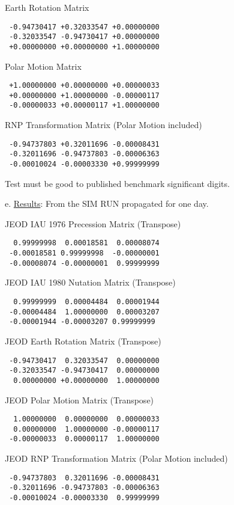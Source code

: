 Earth Rotation Matrix
\begin{verbatim}
 -0.94730417 +0.32033547 +0.00000000
 -0.32033547 -0.94730417 +0.00000000
 +0.00000000 +0.00000000 +1.00000000
\end{verbatim}

Polar Motion Matrix
\begin{verbatim}
 +1.00000000 +0.00000000 +0.00000033
 +0.00000000 +1.00000000 -0.00000117
 -0.00000033 +0.00000117 +1.00000000
\end{verbatim}

RNP Transformation Matrix (Polar Motion included)
\begin{verbatim}
 -0.94737803 +0.32011696 -0.00008431
 -0.32011696 -0.94737803 -0.00006363
 -0.00010024 -0.00003330 +0.99999999
\end{verbatim}

Test must be good to published benchmark significant digits.\newline

e. \underline{Results}:\newline
From the SIM RUN propagated for one day.

JEOD IAU 1976 Precession Matrix (Transpose)
\begin{verbatim}
  0.99999998  0.00018581  0.00008074
 -0.00018581 0.99999998  -0.00000001
 -0.00008074 -0.00000001  0.99999999
\end{verbatim}

JEOD IAU 1980 Nutation Matrix (Transpose)
\begin{verbatim}
  0.99999999  0.00004484  0.00001944
 -0.00004484  1.00000000  0.00003207
 -0.00001944 -0.00003207 0.99999999
\end{verbatim}

JEOD Earth Rotation Matrix (Transpose)
\begin{verbatim}
 -0.94730417  0.32033547  0.00000000
 -0.32033547 -0.94730417  0.00000000
  0.00000000 +0.00000000  1.00000000
\end{verbatim}

JEOD Polar Motion Matrix (Transpose)
\begin{verbatim}
  1.00000000  0.00000000  0.00000033
  0.00000000  1.00000000 -0.00000117
 -0.00000033  0.00000117  1.00000000
\end{verbatim}


JEOD RNP Transformation Matrix (Polar Motion included)
\begin{verbatim}
 -0.94737803  0.32011696 -0.00008431
 -0.32011696 -0.94737803 -0.00006363
 -0.00010024 -0.00003330  0.99999999
\end{verbatim}

